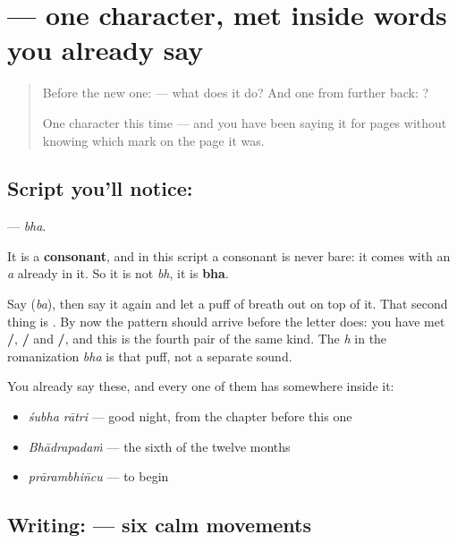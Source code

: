 \section[\texorpdfstring{\te{భ} (bha)}{భ (bha)}]{ — one character, met inside words you already say}

\label{lesson:TE-S128-letter-bha}



\begin{quote}
Before the new one:  — what does it do? And one from further back: ?

One character this time — and you have been saying it for pages without knowing which mark on the page it was.
\end{quote}

\subsection*{Script you'll notice: }
\textbf{} — \emph{bha}.

It is a \textbf{consonant}, and in this script a consonant is never bare: it comes with an \emph{a} already in it. So it is not \emph{bh}, it is \textbf{bha}.

Say \textbf{} (\emph{ba}), then say it again and let a puff of breath out on top of it. That second thing is \textbf{}. By now the pattern should arrive before the letter does: you have met \textbf{/}, \textbf{/} and \textbf{/}, and this is the fourth pair of the same kind. The \emph{h} in the romanization \emph{bha} is that puff, not a separate sound.

You already say these, and every one of them has  somewhere inside it:

\begin{itemize}
\raggedright
  \item \textbf{ } \emph{śubha rātri} — good night, from the chapter before this one
  \item \textbf{} \emph{Bhādrapadaṁ} — the sixth of the twelve months
  \item \textbf{} \emph{prārambhin̄cu} — to begin
\end{itemize}

\subsection*{Writing:  — six calm movements}

